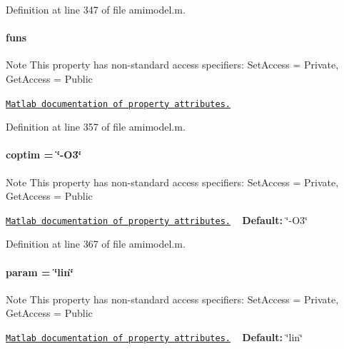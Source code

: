 Definition at line 347 of file amimodel.\+m.

\hypertarget{classamimodel_af80b2560853c3df2b09fef2a198cf5b8}{}
\paragraph[{funs}]{\setlength{\rightskip}{0pt plus 5cm}funs}\label{classamimodel_af80b2560853c3df2b09fef2a198cf5b8}
\begin{DoxyNote}{Note}
This property has non-\/standard access specifiers\+: {\ttfamily Set\+Access = Private, Get\+Access = Public} 

\href{http://www.mathworks.com/help/matlab/matlab_oop/property-attributes.html}{\tt Matlab documentation of property attributes.} 
\end{DoxyNote}


Definition at line 357 of file amimodel.\+m.

\hypertarget{classamimodel_ad99abcd270ac97546c46292ebc6c2e0a}{}
\paragraph[{coptim}]{\setlength{\rightskip}{0pt plus 5cm}coptim = \char`\"{}-\/O3\char`\"{}}\label{classamimodel_ad99abcd270ac97546c46292ebc6c2e0a}
\begin{DoxyNote}{Note}
This property has non-\/standard access specifiers\+: {\ttfamily Set\+Access = Private, Get\+Access = Public} 

\href{http://www.mathworks.com/help/matlab/matlab_oop/property-attributes.html}{\tt Matlab documentation of property attributes.} ~\newline
{\bfseries Default\+:} \char`\"{}-\/\+O3\char`\"{} 
\end{DoxyNote}


Definition at line 367 of file amimodel.\+m.

\hypertarget{classamimodel_a51f20d6b1b54a2eee3be0e8adc96a0ae}{}
\paragraph[{param}]{\setlength{\rightskip}{0pt plus 5cm}param = \char`\"{}lin\char`\"{}}\label{classamimodel_a51f20d6b1b54a2eee3be0e8adc96a0ae}
\begin{DoxyNote}{Note}
This property has non-\/standard access specifiers\+: {\ttfamily Set\+Access = Private, Get\+Access = Public} 

\href{http://www.mathworks.com/help/matlab/matlab_oop/property-attributes.html}{\tt Matlab documentation of property attributes.} ~\newline
{\bfseries Default\+:} \char`\"{}lin\char`\"{} 
\end{DoxyNote}


